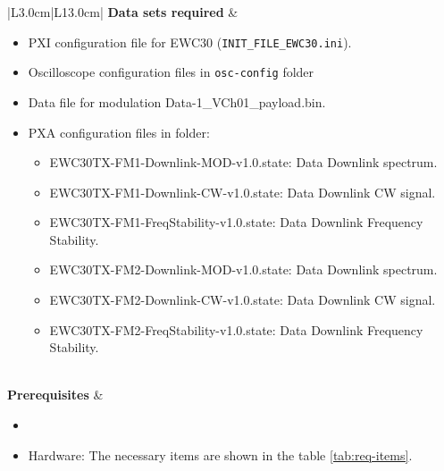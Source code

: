 \begin{table}[H]
\begin{tabular}{|L{3.0cm}|L{13.0cm}|}
		\textbf{Data sets required} & 
		\begin{minipage}[t]{\linewidth}
		   \begin{itemize}[nosep,after=\strut]
			   \item \comEgse{}{} PXI configuration file for EWC30 (\texttt{INIT\_FILE\_EWC30.ini}).
			   \item Oscilloscope configuration files in \texttt{osc-config} folder
			   \item Data file for modulation Data-1\_VCh01\_payload.bin.
			   \item PXA configuration files in \texttt{\pxaTestFolderName} folder:
					 \begin{itemize}[nosep,after=\strut]
						\item EWC30TX-FM1-Downlink-MOD-v1.0.state: Data Downlink spectrum.%
						\item EWC30TX-FM1-Downlink-CW-v1.0.state: Data Downlink CW signal.%
						\item EWC30TX-FM1-FreqStability-v1.0.state: Data Downlink Frequency Stability.%
						\item EWC30TX-FM2-Downlink-MOD-v1.0.state: Data Downlink spectrum.%
						\item EWC30TX-FM2-Downlink-CW-v1.0.state: Data Downlink CW signal.%
						\item EWC30TX-FM2-FreqStability-v1.0.state: Data Downlink Frequency Stability.%
					 \end{itemize}
		   \end{itemize}
	   \end{minipage}\\\hline
	   \textbf{Prerequisites} & 
	   \begin{minipage}[t]{\linewidth}
		   \begin{itemize}[nosep,after=\strut]
			\item \preReqPro
			   \item Hardware: The necessary items are shown in the table \ref{tab:req-items}.
		   \end{itemize} 
	   \end{minipage}\\\hline
   \end{tabular}
	   \caption{Procedure \subprocid{} \ description. } \label{tb:datastability}
	   \end{table}

